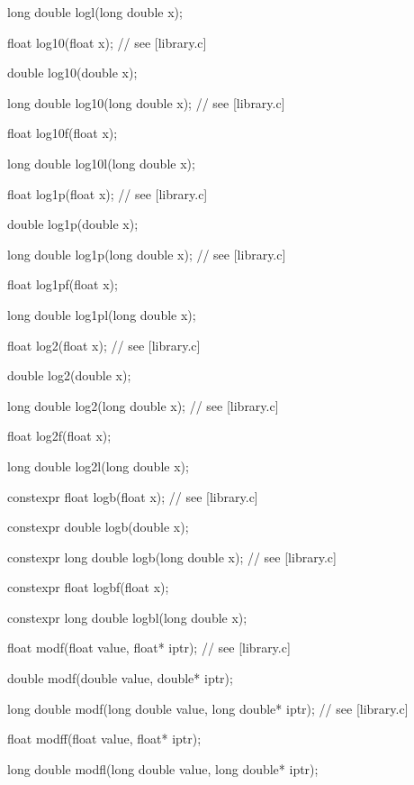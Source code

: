 \documentclass[prd,twocolumn,amsmath,amssymb,nofootinbib,eqsecnum]{revtex4-1}
\newcommand{\highlight}[1]{{\color{red} #1}}
\begin{document}
\begin{widetext}
{long double logl(long double x);

\vspace{2ex}

float log10(float x); // see [library.c]

double log10(double x);

long double log10(long double x); // see [library.c]

float log10f(float x);

long double log10l(long double x);

\vspace{2ex}

float log1p(float x); // see [library.c]

double log1p(double x);

long double log1p(long double x); // see [library.c]

float log1pf(float x);

long double log1pl(long double x);

\vspace{2ex}

float log2(float x); // see [library.c]

double log2(double x);

long double log2(long double x); // see [library.c]

float log2f(float x);

long double log2l(long double x);

\vspace{2ex}

\highlight{constexpr} float logb(float x); // see [library.c]

\highlight{constexpr} double logb(double x);

\highlight{constexpr} long double logb(long double x); // see [library.c]

\highlight{constexpr} float logbf(float x);

\highlight{constexpr} long double logbl(long double x);

\vspace{2ex}

float modf(float value, float* iptr); // see [library.c]

double modf(double value, double* iptr);

long double modf(long double value, long double* iptr); // see [library.c]

float modff(float value, float* iptr);

long double modfl(long double value, long double* iptr);

}
\end{widetext}
\end{document}
